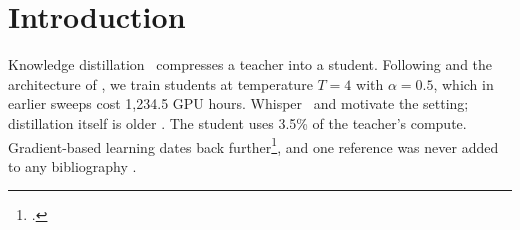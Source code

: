 \section{Introduction}\label{sec:intro}
Knowledge distillation~\citep{hinton2015distilling} compresses a teacher into a
student. Following \citet[Sec.~3]{sanh2019distilbert} and the architecture of
\citealp{vaswani2017attention}, we train students at temperature $T = 4$ with
$\alpha = 0.5$, which in earlier sweeps cost 1{,}234.5 GPU hours.
Whisper~\parencite[see][p.~4]{radford2023whisper} and \textcite{gandhi2023distilwhisper}
motivate the setting; distillation itself is older \autocite{hinton2015distilling,
sanh2019distilbert}.
The student uses 3.5\% of the teacher's compute.%
Gradient-based learning dates back further\footcite{lecun1998gradient}, and one
reference was never added to any bibliography \cite{missing2020ghost}.
